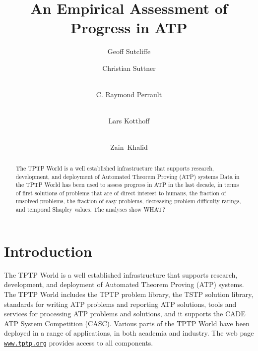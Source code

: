 \documentclass[runningheads]{llncs}
\begin{document}
\title{An Empirical Assessment of Progress in ATP}

\author{
Geoff Sutcliffe
\and
Christian Suttner
\and \\
C. Raymond Perrault
\and \\
Lars Kotthoff
\and \\
Zain~Khalid
}

\maketitle
\begin{abstract}
The TPTP World is a well established infrastructure that supports research, development, and 
deployment of Automated Theorem Proving (ATP) systems
Data in the TPTP World has been used to assess progress in ATP in the last decade, in
terms of 
first solutions of problems that are of direct interest to humans, 
the fraction of unsolved problems, 
the fraction of easy problems,
decreasing problem difficulty ratings, 
and 
temporal Shapley values.
The analyses show WHAT?

\end{abstract}
\section{Introduction}
\label{Introduction}

The TPTP World \cite{Sut17} is a well established infrastructure that supports research, 
development, and deployment of Automated Theorem Proving (ATP) systems.
The TPTP World includes the TPTP problem library,
the TSTP solution library,
standards for writing ATP problems and reporting ATP solutions,
tools and services for processing ATP problems and solutions,
and it supports the CADE ATP System Competition (CASC).
Various parts of the TPTP World have been deployed in a range of applications,
in both academia and industry.
The web page \href{https://www.tptp.org}{\tt www.tptp.org} provides access to all 
components.
\end{document}
